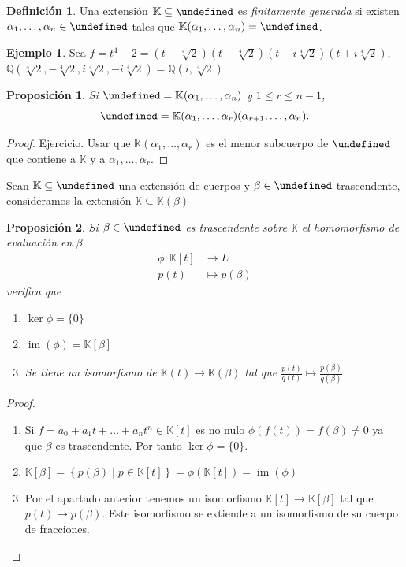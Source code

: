 \documentclass[10pt, spanish]{report}
\newtheorem*{prop}{Proposición}
\theoremstyle{definition}
\newtheorem*{defin}{Definición}
\newtheorem*{ej}{Ejemplo}
\newcommand{\Q}{\mathbb{Q}}
\newcommand{\K}{\mathbb{K}}
\let\L\undefined
\newcommand{\L}{\mathbb{L}}
\newcommand{\im}[1]{\operatorname{im}\left(#1\right)}
\renewcommand{\leq}{\leqslant}
\begin{document}
\begin{defin}
    Una extensión $\K\subseteq\L$ es \textit{finitamente generada} si existen
    $\alpha_1,\ldots,\alpha_n\in\L$ tales que $\K(\alpha_1,\ldots,\alpha_n)=\L$.
\end{defin}

\begin{ej}
    Sea
    $f=t^4-2=(t-\sqrt[4]{2})(t+\sqrt[4]{2})(t-i\sqrt[4]{2})(t+i\sqrt[4]{2})$,
    $\Q(\sqrt[4]{2},-\sqrt[4]{2},i\sqrt[4]{2},-i\sqrt[4]{2})=\Q(i,\sqrt[4]{2})$
\end{ej}

\begin{prop}
Si $\L=\K(\alpha_1,\ldots,\alpha_n)$ y $1\leq r\leq n-1$,
\[\L=\K(\alpha_1,\ldots,\alpha_r)(\alpha_{r+1},\ldots,\alpha_n).\]
\end{prop}

\begin{proof}
    Ejercicio. Usar que $\K(\alpha_1,\ldots,\alpha_r)$ es el menor subcuerpo de
    $\L$ que contiene a $\K$ y a $\alpha_1,\ldots,\alpha_r$.
\end{proof}

Sean $\K\subseteq\L$ una extensión de cuerpos y $\beta\in\L$ trascendente,
consideramos la extensión $\K\subseteq\K(\beta)$

\begin{prop}
    Si $\beta\in\L$ es trascendente sobre $\K$ el homomorfismo de evaluación en
    $\beta$
    \begin{align*}
        \phi:\K[t]&\to L \\
    p(t)&\mapsto p(\beta)
    \end{align*}
    verifica que
    \begin{enumerate}
        \item $\ker{\phi}=\{0\}$
        \item $\im{\phi}=\K[\beta]$
        \item Se tiene un isomorfismo de $\K(t)\to \K(\beta)$ tal que
            $\frac{p(t)}{q(t)}\mapsto \frac{p(\beta)}{q(\beta)}$
    \end{enumerate}
\end{prop}

\begin{proof}\hspace{0pt}
    \begin{enumerate}
        \item Si $f=a_0+a_1t+\ldots+a_nt^n\in\K[t]$ es no nulo
            $\phi(f(t))=f(\beta)\neq0$ ya que $\beta$ es trascendente. Por tanto
            $\ker{\phi}=\{0\}$.
        \item $\K[\beta]=\left\{ p(\beta)\mid
            p\in\K[t]\right\}=\phi(\K[t])=\im{\phi}$
        \item Por el apartado anterior tenemos un isomorfismo
            $\K[t]\to \K[\beta]$  tal que $p(t)\mapsto p(\beta)$. Este
            isomorfismo se extiende a un isomorfismo de su cuerpo de fracciones.
    \end{enumerate}
\end{proof}
\end{document}
